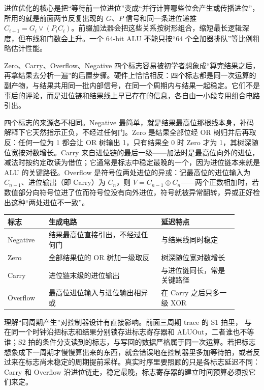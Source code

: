 进位优化的核心是把“等待前一位进位”变成“并行计算哪些位会产生或传播进位”，所用的就是前面两节反复出现的 \(G\)、\(P\) 信号和同一条进位递推 \(C_{i+1}=G_i\lor(P_iC_i)\)。前缀加法器会把这些关系按树形组合，缩短最长逻辑深度，但布线和门数会上升。一个 64-bit ALU 不能只按“64 个全加器排队”等比例粗略估计性能。

Zero、Carry、Overflow、Negative 四个标志容易被初学者想象成“算完结果之后，再拿结果去分析一遍”的后置步骤。硬件上恰恰相反：四个标志都是同一次运算的副产物，与结果共用同一批内部信号，在同一个周期内与结果一起稳定。它们不是事后的评论，而是进位链和结果线上早已存在的信息，各自由一小段专用组合电路引出。

四个标志的来源各不相同。Negative 最简单，就是结果最高位那根线本身，补码解释下它天然指示正负，不经过任何门。Zero 是结果全部位经 OR 树归并后再取反：任何一位为 1 都会让 OR 树输出 1，只有结果全 0 时 Zero 才为 1，其树深随位宽按对数增长。Carry 来自进位链的最后一级——加法时是最高位向外的进位，减法时按约定改读为借位；它通常是标志中稳定最晚的一个，因为进位链本来就是 ALU 的关键路径。Overflow 是符号位两处进位的异或：记最高位的进位输入为 \(C_{n-1}\)、进位输出（即 Carry）为 \(C_n\)，则 \(V=C_{n-1}\oplus C_n\)——两个正数相加时，若数值部分向符号位进了位而符号位没有向外进位，符号就被异常翻转，异或正好检出这种“两处进位不一致”。

\begin{longtable}{L{0.16\linewidth}L{0.44\linewidth}L{0.3\linewidth}}
\toprule
标志 & 生成电路 & 延迟特点 \\
\midrule
Negative & 结果最高位直接引出，不经过任何门 & 与结果线同时稳定 \\\tablerowrule
Zero & 全部结果位的 OR 树加一级取反 & 树深随位宽对数增长 \\\tablerowrule
Carry & 进位链末级的进位输出 & 与进位链同长，常是关键路径 \\\tablerowrule
Overflow & 最高位进位输入与进位输出相异或 & 在 Carry 之后只多一级 XOR \\
\bottomrule
\end{longtable}

理解“同周期产生”对控制器设计有直接影响。前面三周期 trace 的 S1 拍里， 与  在同一个时钟沿把标志和结果分别锁存进标志寄存器和 ALUOut，二者谁也不等谁；S2 拍的条件分支读到的标志，与写回的数据严格属于同一次运算。若把标志想象成下一周期才慢慢算出来的东西，就会错误地在控制器里多加等待拍，或者反过来在标志尚未稳定的周期提前采样。真实时序里要照顾的只是各标志延迟不同：Carry 和 Overflow 沿进位链走，稳定最晚，标志寄存器的建立时间预算必须按它们来定。

